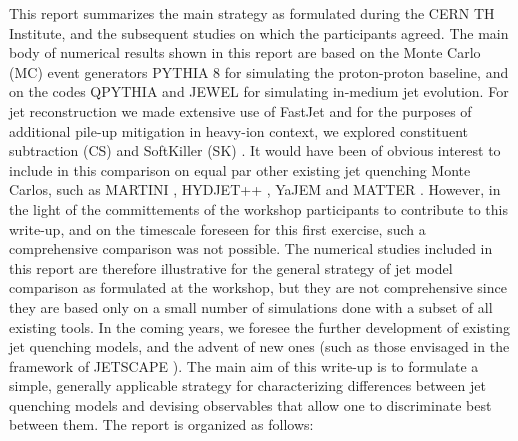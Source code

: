 This report summarizes the main strategy as formulated during the CERN TH Institute, and the subsequent studies on which the participants agreed. 
The main body of numerical results shown in this report are based 
on  the Monte Carlo (MC) event generators PYTHIA 8 \cite{Sjostrand:2007gs} for simulating the proton-proton baseline, and on the 
codes QPYTHIA \cite{Armesto:2009fj} and JEWEL \cite{Zapp:2011ya,Zapp:2012ak} for simulating in-medium jet evolution.
  For jet reconstruction we made extensive use of FastJet \cite{Cacciari:2005hq,Cacciari:2011ma} and for the purposes of additional pile-up mitigation in heavy-ion context, we explored constituent subtraction (CS) \cite{Berta:2014eza} and SoftKiller (SK) \cite{Cacciari:2014gra}. It would have been of obvious 
interest to include in this comparison on equal par other existing jet quenching Monte Carlos, such as MARTINI \cite{Schenke:2009gb,Young:2011ug}, HYDJET++ \cite{Lokhtin:2008xi}, YaJEM \cite{Renk:2010zx} and MATTER \cite{Majumder:2013re}. However, in the light of the committements of the workshop participants 
to contribute to this write-up, and on the timescale foreseen for this first exercise, such a comprehensive comparison was not possible. 
The numerical studies included in this report are therefore illustrative for the general strategy of jet model comparison as formulated at the workshop, 
but they are not comprehensive since they are based only on a small number of simulations done with a subset of all existing tools. In the coming years,
we  foresee the further development of existing jet quenching models, and the advent of new ones (such as those envisaged in the framework of 
JETSCAPE \cite{Cao:2017zih}). The main aim of this write-up is to formulate a simple, generally applicable strategy for characterizing differences
between jet quenching models and devising observables that allow one to discriminate best between them. The report is organized as follows:

